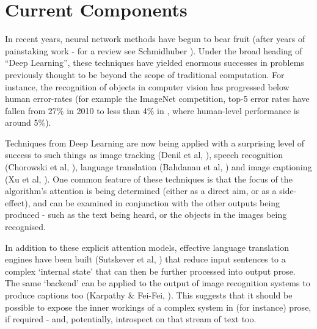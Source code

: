 \documentclass[citeauthoryear]{llncs}
\begin{document}


\section{Current Components}

In recent years, neural network methods have begun to bear fruit (after years
of painstaking work - for a review see Schmidhuber \cite{SchmidhuberOverview}).
%
Under the broad heading of ``Deep Learning'', these techniques have yielded 
enormous successes in problems previously thought to be beyond the scope of traditional computation.
%
For instance, the recognition of objects in computer vision 
has progressed below human error-rates (for example the ImageNet competition, top-5 error rates
have fallen from 27\% in 2010 to less than 4\% in \cite{MSRresnet}, where human-level performance is around 5\%).

Techniques from Deep Learning are now being applied with a surprising 
level of success to such things as 
image tracking (Denil et al, \cite{VisualAttention}), 
speech recognition (Chorowski et al, \cite{SpeechAttention}), 
language translation (Bahdanau et al, \cite{TranslationAttention}) 
and image captioning (Xu et al, \cite{ImageCaptioning}).
%
One common feature of these techniques is that
the focus of the algorithm's attention is being determined 
(either as a direct aim, or as a side-effect), 
and can be examined in conjunction with the other outputs being produced - 
such as the text being heard, or the objects in the images being recognised.




In addition to these explicit attention models, effective language translation
engines have been built (Sutskever et al, \cite{SequenceToSequence}) that reduce
input sentences to a complex `internal state' that can then be further processed into
output prose.  The same `backend' can be applied to the output of image recognition
systems to produce captions too (Karpathy \& Fei-Fei, \cite{karpathy2014deep}).
%
This suggests that it should be possible to expose the inner workings of 
a complex system in (for instance) prose, if required - and, potentially,
introspect on that stream of text too.
\end{document}
